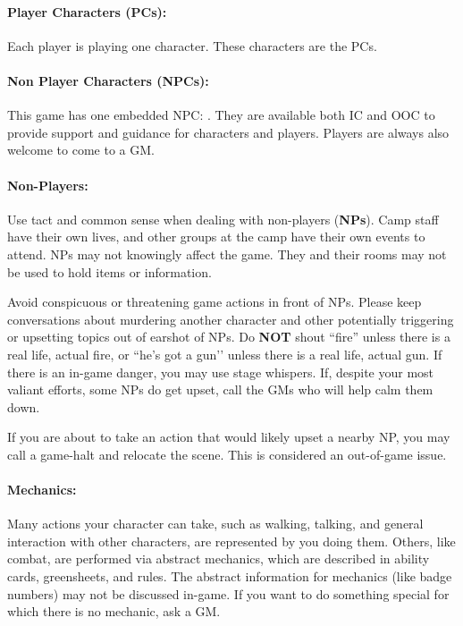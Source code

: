 \documentclass[sheet]{GL2020}
\begin{document}
\paragraph{Player Characters (PCs):} Each player is playing one character. These characters are the PCs.

\paragraph{Non Player Characters (NPCs):} This game has one embedded NPC: \cPrincipal{\intro}. They are available both IC and OOC to provide support and guidance for characters and players. Players are always also welcome to come to a GM.

\paragraph{Non-Players:} Use tact and common sense when dealing with non-players ({\bf NPs}). Camp staff have their own lives, and other groups at the camp have their own events to attend. NPs may not knowingly affect the game. They and their rooms may not be used to hold items or information.

Avoid conspicuous or threatening game actions in front of NPs. Please keep conversations about murdering another character and other potentially triggering or upsetting topics out of earshot of NPs. Do \textbf{NOT} shout ``fire'' unless there is a real life, actual fire, or ``he’s got a gun’’ unless there is a real life, actual gun. If there is an in-game danger, you may use stage whispers. If, despite your most valiant efforts, some NPs do get upset, call the GMs who will help calm them down.

If you are about to take an action that would likely upset a nearby NP, you may call a game-halt and relocate the scene. This is considered an out-of-game issue.

\paragraph{Mechanics:} Many actions your character can take, such as walking, talking, and general interaction with other characters, are represented by you doing them. Others, like combat, are performed via abstract mechanics, which are described in ability cards, greensheets, and rules. The abstract information for mechanics (like badge numbers) may not be discussed in-game. If you want to do something special for which there is no mechanic, ask a GM.
\end{document}
